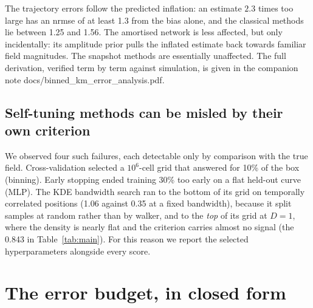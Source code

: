 \documentclass[11pt,a4paper]{article}
\newcommand{\code}[1]{{\ttfamily\small #1}}
\begin{document}
The trajectory errors follow the predicted inflation: an estimate $2.3$ times too large has an
nrmse of at least 1.3 from the bias alone, and the classical methods lie between 1.25 and
1.56. The amortised network is less affected, but only incidentally: its amplitude prior
pulls the inflated estimate back towards familiar field magnitudes. The snapshot methods are
essentially unaffected. The full derivation, verified term by term against simulation, is
given in the companion note \code{docs/binned\_km\_error\_analysis.pdf}.

\subsection{Self-tuning methods can be misled by their own criterion}
\label{sec:selftuning}

We observed four such failures, each detectable only by comparison with the true field.
Cross-validation selected a $10^6$-cell grid that answered for 10\% of the box (binning).
Early stopping ended training 30\% too early on a flat held-out curve (MLP). The KDE bandwidth
search ran to the bottom of its grid on temporally correlated positions (1.06 against 0.35 at
a fixed bandwidth), because it split samples at random rather than by walker, and to the
\emph{top} of its grid at $D=1$, where the density is nearly flat and the criterion carries
almost no signal (the 0.843 in Table~\ref{tab:main}). For this reason we report the selected
hyperparameters alongside every score.

\section{The error budget, in closed form}
\end{document}
